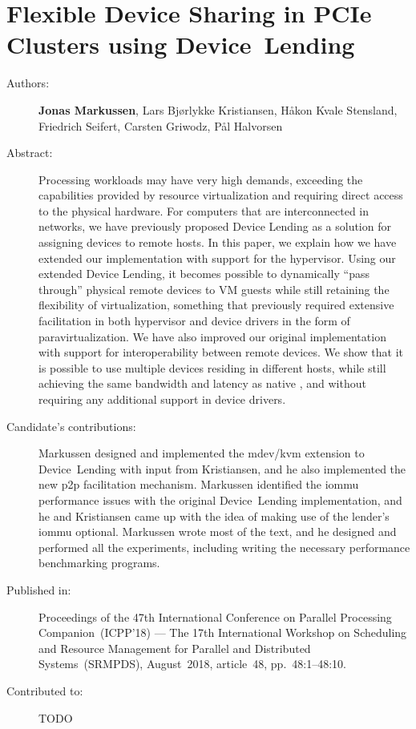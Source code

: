 \chapter{Flexible Device Sharing in PCIe Clusters using Device~Lending}
\label{paper:SRMPDS}
\paperthumb

\begin{description}
	\item[Authors:]
		\textbf{Jonas Markussen}, Lars Bj{\o}rlykke Kristiansen, H{\aa}kon Kvale Stensland,
		Friedrich Seifert, Carsten Griwodz, P{\aa}l Halvorsen

	\item[Abstract:]
		Processing workloads may have very high  demands, exceeding the capabilities provided by resource
		virtualization and requiring direct access to the physical hardware.
		For computers that are interconnected in  networks, we have previously proposed 
		Device Lending as a solution for assigning devices to remote hosts. In this paper, we
		explain how we have extended our implementation with support for the  hypervisor.
		Using our extended Device Lending, it becomes possible to dynamically ``pass through'' physical remote devices
		to VM guests while still retaining the flexibility of virtualization, something that previously required
		extensive facilitation in both hypervisor and device drivers in the form of \gls{paravirtualization}.
		We have also improved our original implementation with support for interoperability between remote devices.
		We show that it is possible to use multiple devices residing in different hosts, while still achieving the same
		bandwidth and latency as native , and without requiring any additional support in device drivers. 


	\item[Candidate's contributions:]
		Markussen designed and implemented the \acrshort{mdev}/\acrshort{kvm} extension to Device~Lending with input from Kristiansen,
		and he also implemented the new \acrshort{p2p} facilitation mechanism.
		Markussen identified the \acrshort{iommu} performance issues with the original Device~Lending implementation, and he and Kristiansen
		came up with the idea of making use of the lender's \acrshort{iommu} optional.
		Markussen wrote most of the text, and he designed and performed all the experiments, including writing the necessary performance benchmarking 
		programs.

	\item[Published in:]
		Proceedings of the 47th International Conference on Parallel Processing Companion~(ICPP'18) ---
		The 17th International Workshop on Scheduling and Resource Management for Parallel and Distributed Systems~(SRMPDS),
		August~2018, article~48, pp.~48:1--48:10.

	\item[Contributed to:]
		TODO

\end{description}
